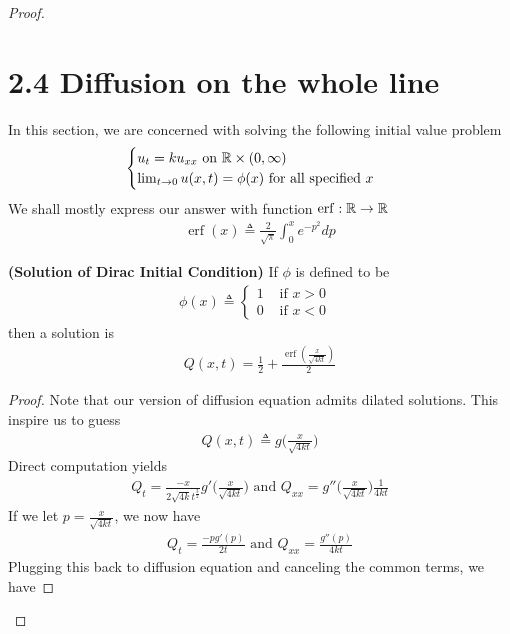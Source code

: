 \documentclass{report}
\begin{document}
\begin{proof}
\section{2.4 Diffusion on the whole line}
\begin{mdframed}
In this section, we are concerned with solving the following initial value problem 
\begin{align*}
\begin{cases}
  u_t=ku_{xx}\text{ on }\mathbb{R} \times (0,\infty)\\
  \lim_{t\to 0}u(x,t)=\phi (x)\text{ for all specified $x$ } 
\end{cases}
\end{align*}
We shall mostly express our answer with function $\operatorname{erf}:\mathbb{R}\rightarrow \mathbb{R}$  
\begin{align*}
\operatorname{erf}(x)\triangleq  \frac{2}{\sqrt{\pi}}\int_0^x e^{-p^2}dp
\end{align*}
\end{mdframed}
\begin{theorem}
\textbf{(Solution of Dirac Initial Condition)} If $\phi$ is defined to be 
\begin{align*}
\phi (x)\triangleq \begin{cases}
  1& \text{ if }x>0 \\
  0& \text{ if $x<0$ }
\end{cases}
\end{align*}
then a solution is 
\begin{align}
\label{sou}
Q(x,t)= \frac{1}{2}+ \frac{\operatorname{erf}(\frac{x}{\sqrt{4kt}})}{2}
\end{align}
\end{theorem}
\begin{proof}
Note that our version of diffusion equation admits dilated solutions. This inspire us to guess 
\begin{align*}
Q(x,t)\triangleq g \Big( \frac{x}{\sqrt{4kt} } \Big)
\end{align*}
Direct computation yields
\begin{align*}
Q_t= \frac{-x}{2\sqrt{4k}t^{\frac{3}{2}}}g'\Big( \frac{x}{\sqrt{4kt} } \Big)\text{ and }Q_{xx}=g''\Big(\frac{x}{\sqrt{4kt} } \Big) \frac{1}{4kt}
\end{align*}
If we let $p= \frac{x}{\sqrt{4kt} }$, we now have 
\begin{align*}
Q_t=\frac{-pg'(p)}{2t}\text{ and }Q_{xx}=\frac{g''(p)}{4kt} 
\end{align*}
Plugging this back to diffusion equation and canceling the common terms, we have

\end{proof}
\end{proof}
\end{document}
